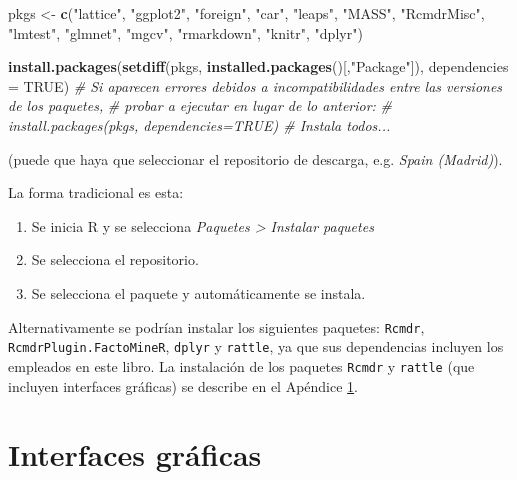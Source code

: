 \documentclass[]{book}
\newenvironment{Shaded}{\begin{snugshade}}{\end{snugshade}}
\newcommand{\KeywordTok}[1]{\textcolor[rgb]{0.13,0.29,0.53}{\textbf{#1}}}
\newcommand{\DataTypeTok}[1]{\textcolor[rgb]{0.13,0.29,0.53}{#1}}
\newcommand{\StringTok}[1]{\textcolor[rgb]{0.31,0.60,0.02}{#1}}
\newcommand{\CommentTok}[1]{\textcolor[rgb]{0.56,0.35,0.01}{\textit{#1}}}
\newcommand{\OtherTok}[1]{\textcolor[rgb]{0.56,0.35,0.01}{#1}}
\newcommand{\NormalTok}[1]{#1}
\begin{document}
\begin{Shaded}
\begin{Highlighting}[]
\NormalTok{pkgs <-}\StringTok{ }\KeywordTok{c}\NormalTok{(}\StringTok{"lattice"}\NormalTok{, }\StringTok{"ggplot2"}\NormalTok{, }\StringTok{"foreign"}\NormalTok{, }\StringTok{"car"}\NormalTok{, }\StringTok{"leaps"}\NormalTok{, }\StringTok{"MASS"}\NormalTok{, }\StringTok{"RcmdrMisc"}\NormalTok{, }
          \StringTok{"lmtest"}\NormalTok{, }\StringTok{"glmnet"}\NormalTok{, }\StringTok{"mgcv"}\NormalTok{, }\StringTok{"rmarkdown"}\NormalTok{, }\StringTok{"knitr"}\NormalTok{, }\StringTok{"dplyr"}\NormalTok{)}

\KeywordTok{install.packages}\NormalTok{(}\KeywordTok{setdiff}\NormalTok{(pkgs, }\KeywordTok{installed.packages}\NormalTok{()[,}\StringTok{"Package"}\NormalTok{]), }\DataTypeTok{dependencies =} \OtherTok{TRUE}\NormalTok{)}
\CommentTok{# Si aparecen errores debidos a incompatibilidades entre las versiones de los paquetes, }
\CommentTok{# probar a ejecutar en lugar de lo anterior:}
\CommentTok{# install.packages(pkgs, dependencies=TRUE) # Instala todos...}
\end{Highlighting}
\end{Shaded}

(puede que haya que seleccionar el repositorio de descarga, e.g.
\emph{Spain (Madrid)}).

La forma tradicional es esta:

\begin{enumerate}
\def\labelenumi{\arabic{enumi}.}
\item
  Se inicia R y se selecciona \emph{Paquetes \textgreater{} Instalar
  paquetes}
\item
  Se selecciona el repositorio.
\item
  Se selecciona el paquete y automáticamente se instala.
\end{enumerate}

Alternativamente se podrían instalar los siguientes paquetes:
\texttt{Rcmdr}, \texttt{RcmdrPlugin.FactoMineR}, \texttt{dplyr} y
\texttt{rattle}, ya que sus dependencias incluyen los empleados en este
libro. La instalación de los paquetes \texttt{Rcmdr} y \texttt{rattle}
(que incluyen interfaces gráficas) se describe en el Apéndice
\ref{interfaces}.

\chapter{Interfaces gráficas}\label{interfaces}
\end{document}
